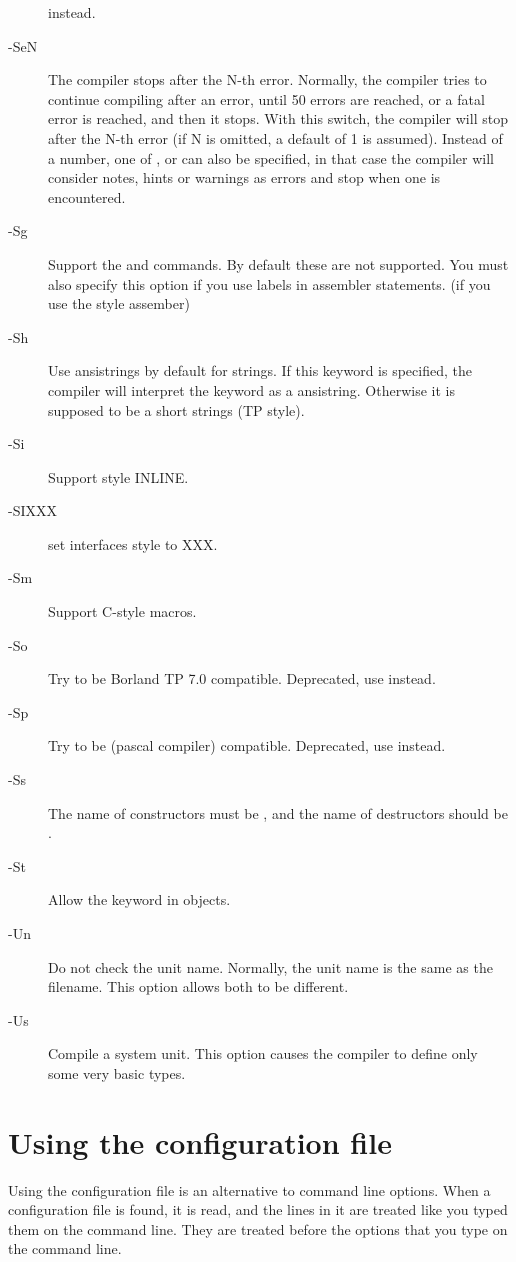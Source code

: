 \begin{description}
 instead. 
\item [-SeN]  The compiler stops after the N-th error. Normally,
the compiler tries to continue compiling after an error, until 50 errors are
reached, or a fatal error is reached, and then it stops. With this switch,
the compiler will stop after the N-th error (if N is omitted, a default of 1
is assumed). Instead of a number, one of ,  or  can also be specified, in that case the compiler will consider notes, hints or warnings as errors and stop when one is encountered.
\item [-Sg]  Support the  and  commands. By
default these are not supported. You must also specify this option if you
use labels in assembler statements. (if you use the  style
assember)
\item [-Sh] Use ansistrings by default for strings. If this keyword is
specified, the compiler will interpret the  keyword as a
ansistring. Otherwise it is supposed to be a short strings (TP style).
\item [-Si]  Support  style INLINE.
\item [-SIXXX] set interfaces style to XXX.
\item [-Sm]  Support C-style macros.
\item [-So]  Try to be Borland TP 7.0 compatible. Deprecated, use
 instead.
\item [-Sp]  Try to be  (\gnu pascal compiler)
compatible. Deprecated, use  instead.
\item [-Ss]  The name of constructors must be , and the
name of destructors should be .
\item [-St]  Allow the  keyword in objects.
\item [-Un]  Do not check the unit name. Normally, the unit name
is the same as the filename. This option allows both to be different.
\item [-Us]  Compile a system unit. This option causes the
compiler to define only some very basic types.
\end{description}


\section{Using the configuration file}
\label{se:configfile}
Using the configuration file  is an alternative to command
line options. When a configuration file is found, it is read, and the lines
in it are treated like you typed them on the command line. They are treated
before the options that you type on the command line.

